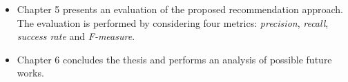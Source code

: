 \begin{itemize}
	\item Chapter 5 presents an evaluation of the proposed 
	recommendation 
	approach.
	The evaluation is performed by 
	considering four metrics: \textit{precision}, 
	\textit{recall}, 
	\textit{success rate} and \textit{F-measure}. 

	\item Chapter 6 concludes the thesis and performs an 
	analysis of possible 
	future works.
	
\end{itemize}

